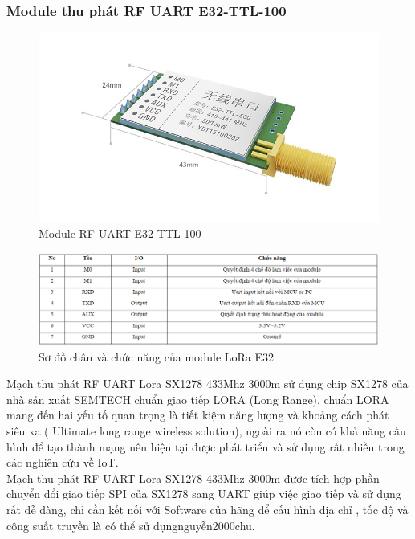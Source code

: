 \subsubsection{Module thu phát RF UART E32-TTL-100}
\begin{figure}[H]
	\centering
	\includegraphics[scale=.4]{Chapter 2/image chapter 2/E32.jpg}
	\caption[Module RF UART E32-TTL-100]{Module RF UART E32-TTL-100}
	\label{hinh22}
\end{figure}
\begin{figure}[H]
	\centering
	\includegraphics[scale=.5]{Chapter 2/image chapter 2/sodochanvachucnangE32.png}
	\caption[Sơ đồ chân và chức năng của module LoRa E32]{Sơ đồ chân và chức năng của module LoRa E32}
	\label{hinh23}
\end{figure}
Mạch thu phát RF UART Lora SX1278 433Mhz 3000m sử dụng chip SX1278 của nhà sản xuất SEMTECH chuẩn giao tiếp LORA (Long Range), chuẩn LORA mang đến hai yếu tố quan trọng là tiết kiệm năng lượng và khoảng cách phát siêu xa ( Ultimate long range wireless solution), ngoài ra nó còn có khả năng cấu hình để tạo thành mạng nên hiện tại được phát triển và sử dụng rất nhiều trong các nghiên cứu về IoT.\\
\indent Mạch thu phát RF UART Lora SX1278 433Mhz 3000m được tích hợp phần chuyển đổi giao tiếp SPI của SX1278 sang UART giúp việc giao tiếp và sử dụng rất dễ dàng, chỉ cần kết nối với Software của hãng để cấu hình địa chỉ , tốc độ và công suất truyền là có thể sử dụngnguyễn2000chu.\\
